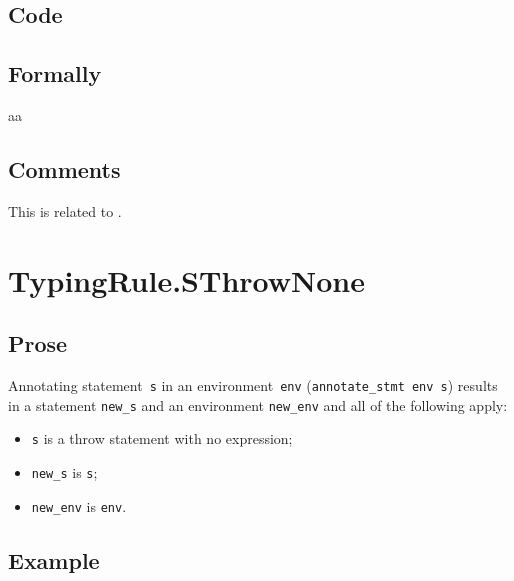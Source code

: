 \documentclass{book}
\newcommand\annotateexpr[1]{\textsf{annotate\_expr}(#1)}
\newcommand\annotatestmt[1]{\texttt{annotate\_stmt}(#1)}
\newcommand\tenv[0]{\texttt{env}}
\newcommand\newenv[0]{\texttt{new\_env}}
\newcommand\veone[0]{\texttt{e1}}
\newcommand\vetwo[0]{\texttt{e2}}
\newcommand\vs[0]{\texttt{s}}
\newcommand\vtone[0]{\texttt{t1}}
\newcommand\vttwo[0]{\texttt{t2}}
\newcommand\news[0]{\texttt{new\_s}}
\newcommand\dir[0]{\texttt{dir}}
\begin{document}
  \subsection{Code}

\begin{emptyformal}
    \subsection{Formally}
    aa
\end{emptyformal}

\subsection{Comments}
    This is related to .


\section{TypingRule.SThrowNone \label{sec:TypingRule.SThrowNone}}

  \subsection{Prose}
Annotating statement~\texttt{s} in an environment~\texttt{env}
(\texttt{annotate\_stmt env s}) results in a statement \texttt{new\_s} and an
environment \texttt{new\_env} and all of the following apply:
   \begin{itemize}
   \item \texttt{s} is a throw statement with no expression;
   \item \texttt{new\_s} is \texttt{s};
   \item \texttt{new\_env} is \texttt{env}.
   \end{itemize}

  \subsection{Example}
\end{document}

